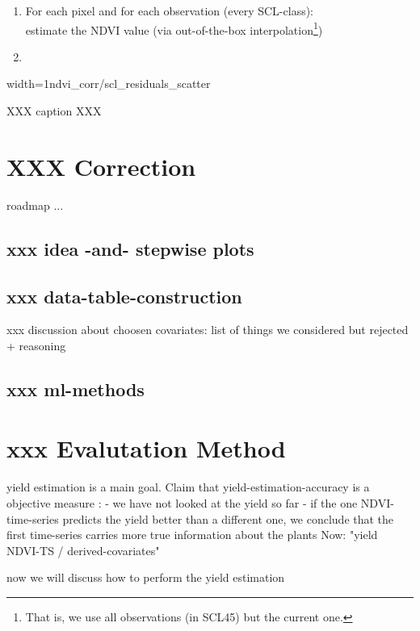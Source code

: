 \begin{enumerate}
    \item For each pixel and for each observation (every SCL-class):\\
          estimate the NDVI value (via out-of-the-box interpolation\footnote{That is, we use all observations (in SCL45) but the current one.})
    \item
\end{enumerate}







\begin{my_figure}[h]{width=1\textwidth}{ndvi_corr/scl_residuals_scatter}
    \caption{XXX caption XXX}
    \label{fig:ndvi_corr/scl_residuals_scatter}
\end{my_figure}


\section{XXX Correction}
roadmap ...

\subsection{xxx idea -and- stepwise plots}

\subsection{xxx data-table-construction}
xxx discussion about choosen covariates:
list of things we considered but rejected + reasoning

\subsection{xxx ml-methods}



\section{xxx Evalutation Method}
yield estimation is a main goal. 
Claim that yield-estimation-accuracy is a objective measure :
    - we have not looked at the yield so far 
    - if the one NDVI-time-series predicts the yield better than a different one, we conclude that the first time-series carries more true information about the plants
Now: "yield ~ NDVI-TS / derived-covariates" 

now we will discuss how to perform the yield estimation
